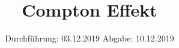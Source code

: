 

\subject{Versuchsnummer: 603}
\title{Compton Effekt}
\date{%
  Durchführung: 03.12.2019
  \hspace{3em}
  Abgabe: 10.12.2019
}



\maketitle
\thispagestyle{empty}
\tableofcontents
\newpage




\newpage
\nocite{*}
\printbibliography


